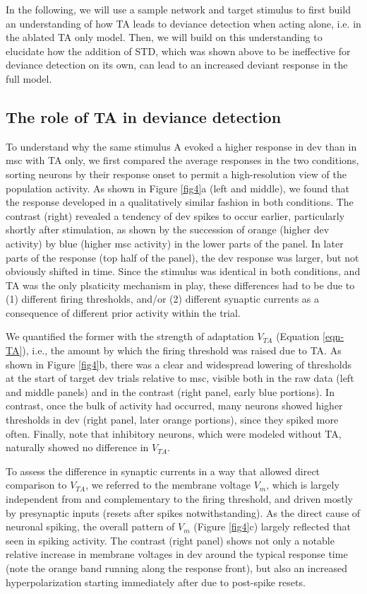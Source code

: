 \documentclass[pdflatex,referee,iicol,sn-basic]{sn-jnl}
\theoremstyle{thmstyleone}%
\theoremstyle{thmstyletwo}%
\theoremstyle{thmstylethree}%
\begin{document}
In the following, we will use a sample network and target stimulus to first build an understanding of how TA leads to deviance detection when acting alone, i.e. in the ablated TA only model. Then, we will build on this understanding to elucidate how the addition of STD, which was shown above to be ineffective for deviance detection on its own, can lead to an increased deviant response in the full model.

\subsection{The role of TA in deviance detection}\label{sec-ta}

To understand why the same stimulus A evoked a higher response in dev than in msc with TA only, we first compared the average responses in the two conditions, sorting neurons by their response onset to permit a high-resolution view of the population activity. As shown in Figure \ref{fig4}a (left and middle), we found that the response developed in a qualitatively similar fashion in both conditions. The contrast (right) revealed a tendency of dev spikes to occur earlier, particularly shortly after stimulation, as shown by the succession of orange (higher dev activity) by blue (higher msc activity) in the lower parts of the panel. In later parts of the response (top half of the panel), the dev response was larger, but not obviously shifted in time. Since the stimulus was identical in both conditions, and TA was the only plsaticity mechanism in play, these differences had to be due to (1) different firing thresholds, and/or (2) different synaptic currents as a consequence of different prior activity within the trial.

We quantified the former with the strength of adaptation $V_{TA}$ (Equation \ref{eqn-TA}), i.e., the amount by which the firing threshold was raised due to TA. As shown in Figure \ref{fig4}b, there was a clear and widespread lowering of thresholds at the start of target dev trials relative to msc, visible both in the raw data (left and middle panels) and in the contrast (right panel, early blue portions). In contrast, once the bulk of activity had occurred, many neurons showed higher thresholds in dev (right panel, later orange portions), since they spiked more often. Finally, note that inhibitory neurons, which were modeled without TA, naturally showed no difference in $V_{TA}$.

To assess the difference in synaptic currents in a way that allowed direct comparison to $V_{TA}$, we referred to the membrane voltage $V_m$, which is largely independent from and complementary to the firing threshold, and driven mostly by presynaptic inputs (resets after spikes notwithstanding). As the direct cause of neuronal spiking, the overall pattern of $V_m$ (Figure \ref{fig4}c) largely reflected that seen in spiking activity. The contrast (right panel) shows not only a notable relative increase in membrane voltages in dev around the typical response time (note the orange band running along the response front), but also an increased hyperpolarization starting immediately after due to post-spike resets.
\end{document}

